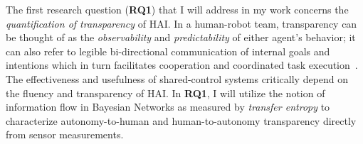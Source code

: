 \documentclass[12pt]{article}
\renewcommand{\sout}[1]{\unskip}
\begin{document}
The first research question (\textbf{RQ1}) that I will address in my work concerns the \textit{quantification of transparency} of HAI. In a human-robot team, transparency can be thought of as the \textit{observability} and \textit{predictability} of either agent's behavior; it can also refer to legible bi-directional communication of internal goals and intentions which in turn facilitates cooperation and coordinated task execution~\cite{kiesler2005fostering}. The effectiveness and usefulness of shared-control systems critically depend on the fluency and transparency of HAI. In \textbf{RQ1}, I will utilize the notion of information flow in Bayesian Networks as measured by \textit{transfer entropy} to characterize autonomy-to-human and human-to-autonomy transparency directly from sensor measurements. \sout{Transfer entropy is an information-theoretic metric that aims to capture the \textit{directed information flow/transfer} from a source random process to a target random process~\cite{schreiber2000measuring}. Higher transfer entropy implies that knowledge of the source process's past state improves the predictability of the target process's future state. Our hypothesis is that in a joint task setting, if the robot behavior is more transparent to the human, the information regarding the autonomy's intention will be utilized properly by the human, who will then likely act in a more predictable manner to achieve the joint task. In such cases, transfer entropy can become a viable metric to capture the increase in predictability caused by higher transparency. }
\end{document}
